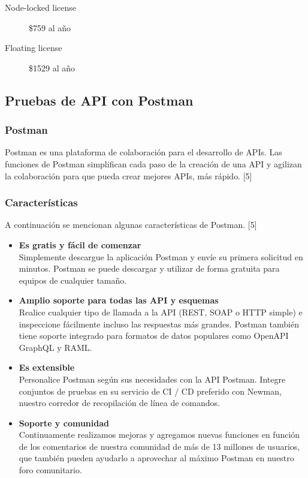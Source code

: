 \documentclass[twoside,twocolumn]{article}
\begin{document}
\begin{description}
  \item[Node-locked license] \$759 al año
  \item[Floating license] \$1529 al año
\end{description}

\subsection{Pruebas de API con Postman}

\subsubsection{Postman}

Postman es una plataforma de colaboración para el desarrollo de APIs. Las funciones de Postman simplifican cada paso de la creación de una API y agilizan la colaboración para que pueda crear mejores APIs, más rápido. [5]

\subsubsection{Características}

A continuación se mencionan algunas características de Postman. [5]

\begin{itemize}
  \item \textbf{Es gratis y fácil de comenzar} \\
  Simplemente descargue la aplicación Postman y envíe su primera solicitud en minutos. Postman se puede descargar y utilizar de forma gratuita para equipos de cualquier tamaño.

  \item \textbf{Amplio soporte para todas las API y esquemas} \\
  Realice cualquier tipo de llamada a la API (REST, SOAP o HTTP simple) e inspeccione fácilmente incluso las respuestas más grandes. Postman también tiene soporte integrado para formatos de datos populares como OpenAPI GraphQL y RAML.

  \item \textbf{Es extensible} \\
  Personalice Postman según sus necesidades con la API Postman. Integre conjuntos de pruebas en su servicio de CI / CD preferido con Newman, nuestro corredor de recopilación de línea de comandos.

  \item \textbf{Soporte y comunidad} \\
  Continuamente realizamos mejoras y agregamos nuevas funciones en función de los comentarios de nuestra comunidad de más de 13 millones de usuarios, que también pueden ayudarlo a aprovechar al máximo Postman en nuestro foro comunitario.
\end{itemize}
\end{document}
